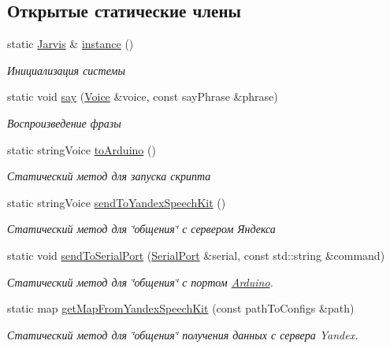 \subsection*{Открытые статические члены}
\begin{DoxyCompactItemize}
\item 
static \hyperlink{classJarvis_1_1Jarvis}{Jarvis} \& \hyperlink{classJarvis_1_1Jarvis_a6f50fbb249174da350352dc3429459b7}{instance} ()
\begin{DoxyCompactList}\small\item\em Инициализация системы \end{DoxyCompactList}\item 
static void \hyperlink{classJarvis_1_1Jarvis_a80c00115e07bf149673b3cf652751386}{say} (\hyperlink{classJarvis_1_1Voice}{Voice} \&voice, const say\+Phrase \&phrase)
\begin{DoxyCompactList}\small\item\em Воспроизведение фразы \end{DoxyCompactList}\item 
static string\+Voice \hyperlink{classJarvis_1_1Jarvis_a2a9f9ca691361b0ef640ac5a150acb39}{to\+Arduino} ()
\begin{DoxyCompactList}\small\item\em Статический метод для запуска скрипта \end{DoxyCompactList}\item 
static string\+Voice \hyperlink{classJarvis_1_1Jarvis_a4b45c41bc3fb910b2cf2f032b5fa0c08}{send\+To\+Yandex\+Speech\+Kit} ()
\begin{DoxyCompactList}\small\item\em Статический метод для \char`\"{}общения\char`\"{} с сервером Яндекса \end{DoxyCompactList}\item 
static void \hyperlink{classJarvis_1_1Jarvis_a211625e415e0aeb22eba6fab2deaa5e1}{send\+To\+Serial\+Port} (\hyperlink{classJarvis_1_1Arduino_1_1Connection_1_1SerialPort}{Serial\+Port} \&serial, const std\+::string \&command)
\begin{DoxyCompactList}\small\item\em Статический метод для \char`\"{}общения\char`\"{} с портом \hyperlink{namespaceArduino}{Arduino}. \end{DoxyCompactList}\item 
static map \hyperlink{classJarvis_1_1Jarvis_a5e7d9053e69eee8154c68e2bc86e7362}{get\+Map\+From\+Yandex\+Speech\+Kit} (const path\+To\+Configs \&path)
\begin{DoxyCompactList}\small\item\em Статический метод для \char`\"{}общения\char`\"{} получения данных с сервера Yandex. \end{DoxyCompactList}\end{DoxyCompactItemize}
